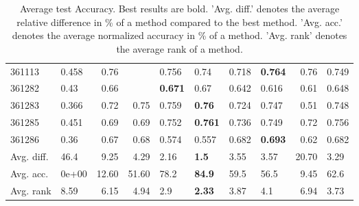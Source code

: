 \begin{table}[ht!]
\begin{tabular}{llrrllllrl}
  361113 & 0.458 & 0.76 &  & 0.756 & 0.74 & 0.718 & \textbf{0.764} & 0.76 & 0.749 \\ 
  361282 & 0.43 & 0.66 &  & \textbf{0.671} & 0.67 & 0.642 & 0.616 & 0.61 & 0.648 \\ 
  361283 & 0.366 & 0.72 & 0.75 & 0.759 & \textbf{0.76} & 0.724 & 0.747 & 0.51 & 0.748 \\ 
  361285 & 0.451 & 0.69 & 0.69 & 0.752 & \textbf{0.761} & 0.736 & 0.749 & 0.72 & 0.756 \\ 
  361286 & 0.36 & 0.67 & 0.68 & 0.574 & 0.557 & 0.682 & \textbf{0.693} & 0.62 & 0.682 \\ 
   \hline
Avg. diff. & 46.4 & 9.25 & 4.29 & 2.16 & \textbf{1.5} & 3.55 & 3.57 & 20.70 & 3.29 \\ 
  Avg. acc. & 0e+00 & 12.60 & 51.60 & 78.2 & \textbf{84.9} & 59.5 & 56.5 & 9.45 & 62.6 \\ 
  Avg. rank & 8.59 & 6.15 & 4.94 & 2.9 & \textbf{2.33} & 3.87 & 4.1 & 6.94 & 3.73 \\ 
   \hline
\hline
\end{tabular}
\endgroup
\caption{Average test Accuracy. 
                  Best results are bold. 
                  'Avg. diff.' denotes the average relative difference in \% of a method compared to the best method.
                  'Avg. acc.' denotes the average normalized accuracy in \% of a method.
                  'Avg. rank' denotes the average rank of a method.} 
\label{TABLES/table_results_Accuracy}
\end{table}
